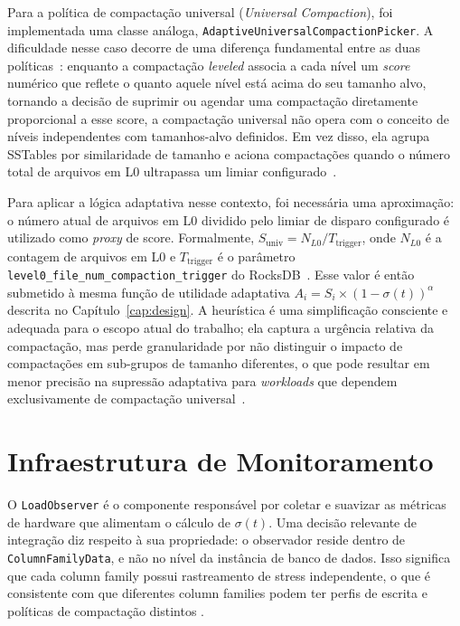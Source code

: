 Para a política de compactação universal (\textit{Universal Compaction}), foi
implementada uma classe análoga, \texttt{AdaptiveUniversalCompactionPicker}.
A dificuldade nesse caso decorre de uma diferença fundamental entre as duas
políticas~\cite{rocksdb_wiki,database_internals}: enquanto a compactação
\textit{leveled} associa a cada nível um \textit{score} numérico que reflete o
quanto aquele nível está acima do seu tamanho alvo, tornando a decisão de
suprimir ou agendar uma compactação diretamente proporcional a esse score,
a compactação universal não opera com o conceito de níveis independentes com
tamanhos-alvo definidos. Em vez disso, ela agrupa SSTables por similaridade de
tamanho e aciona compactações quando o número total de arquivos em L0 ultrapassa
um limiar configurado~\cite{rocksdb_wiki}.

Para aplicar a lógica adaptativa nesse contexto, foi necessária uma aproximação:
o número atual de arquivos em L0 dividido pelo limiar de disparo configurado é
utilizado como \textit{proxy} de score. Formalmente,
$S_{\text{univ}} = N_{L0} / T_{\text{trigger}}$, onde $N_{L0}$ é a contagem de
arquivos em L0 e $T_{\text{trigger}}$ é o parâmetro
\texttt{level0\_file\_num\_compaction\_trigger} do RocksDB~\cite{rocksdb_wiki}.
Esse valor é então submetido à mesma função de utilidade adaptativa
$A_i = S_i \times (1 - \sigma(t))^\alpha$ descrita no Capítulo~\ref{cap:design}.
A heurística é uma simplificação consciente e adequada para o escopo atual do
trabalho; ela captura a urgência relativa da compactação, mas perde granularidade
por não distinguir o impacto de compactações em sub-grupos de tamanho diferentes,
o que pode resultar em menor precisão na supressão adaptativa para
\textit{workloads} que dependem exclusivamente de compactação
universal~\cite{Sarkar_2021,compaction_policies}.

\section{Infraestrutura de Monitoramento}

O \texttt{LoadObserver} é o componente responsável por coletar e suavizar as
métricas de hardware que alimentam o cálculo de $\sigma(t)$. Uma decisão
relevante de integração diz respeito à sua propriedade: o observador reside
dentro de \texttt{ColumnFamilyData}, e não no nível da instância de banco de
dados. Isso significa que cada column family possui rastreamento de stress
independente, o que é consistente com que diferentes column families
podem ter perfis de escrita e políticas de compactação distintos \cite{rocksdb}.

